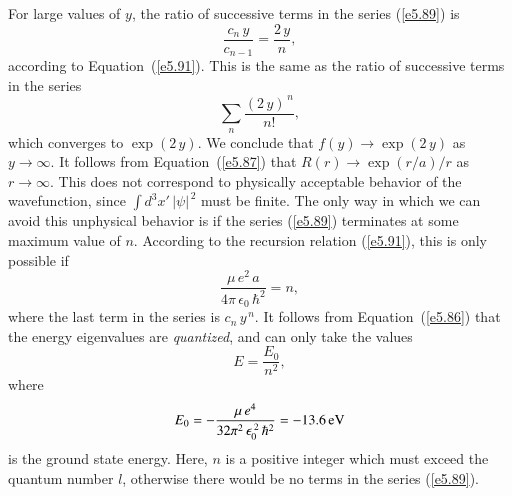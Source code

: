 For large values of $y$, the ratio of successive terms in the series
(\ref{e5.89}) is
\begin{equation}
\frac{c_n \,y}{c_{n-1}} = \frac{2\, y}{n},
\end{equation}
according to Equation~(\ref{e5.91}). This is the same as the ratio of
successive terms in the series
\begin{equation}
\sum_n \frac{(2\,y)^{\,n}}{n!},
\end{equation}
which converges to $\exp(2\,y)$. We conclude that $f(y)\rightarrow \exp(2\,y)$
as $y\rightarrow \infty$. It follows from Equation~(\ref{e5.87})  that $R(r) \rightarrow 
\exp(r/a) /r $ as $r\rightarrow \infty$. This does not correspond to
physically acceptable behavior of the wavefunction, since $\int d^3x'\, |\psi|^{\,2}$
must be finite. The only way in which we can avoid this unphysical
behavior is if the series (\ref{e5.89}) terminates at some maximum value of $n$.
According to the recursion relation (\ref{e5.91}), this is only possible
if
\begin{equation}
\frac{\mu\, e^2 \,a}{4\pi \,\epsilon_0\, \hbar^2} = n,
\end{equation}
where the last term in the series is $c_n\, y^{\,n}$. It follows from Equation~(\ref{e5.86})
that the energy eigenvalues are {\em quantized}, and can only take the values
\begin{equation}\label{e5.95}
E = \frac{E_0}{n^2},
\end{equation}
where
\begin{equation}
E_0 = - \frac{\mu\, e^4}{32\pi^2\,\epsilon_0^{\,2}\, \hbar^2} = - 13.6\,{\rm eV}
\end{equation}
is the ground state energy. 
Here, $n$ is a positive integer which must exceed the quantum number $l$,
otherwise there would be no terms in the series (\ref{e5.89}).

